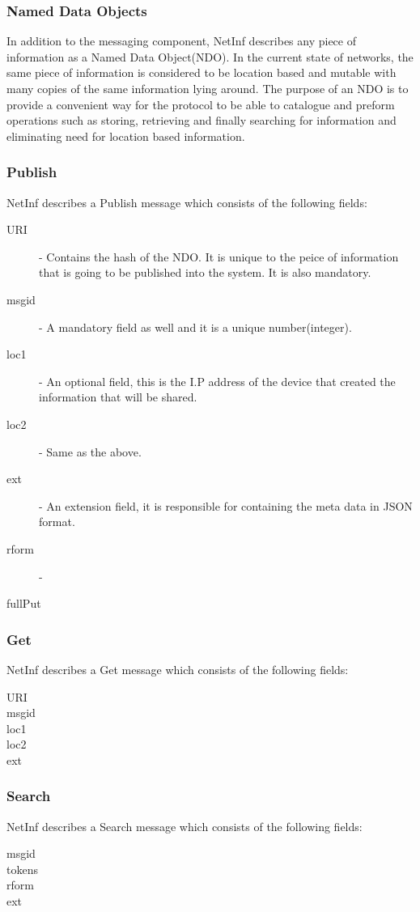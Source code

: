 \subsubsection{Named Data Objects}
In addition to the messaging component, NetInf describes any piece of information as a Named Data Object(NDO). In the current state of networks, the same piece of information is considered to be location based and mutable with many copies of the same information lying around. The purpose of an NDO is to provide a convenient way for the protocol to be able to catalogue and preform operations such as storing, retrieving and finally searching for information and eliminating need for location based information.


\subsubsection{Publish}

NetInf describes a Publish message which consists of the following fields:

\begin{description}
\item[URI]  - Contains the hash of the NDO. It is unique to the peice of information that is going to be published into the system. It is also mandatory.
\item[msgid] - A mandatory field as well and it is a unique number(integer). 
\item[loc1] - An optional field, this is the I.P address of the device that created the information that will be shared.
\item[loc2] - Same as the above.
\item[ext] - An extension field, it is responsible for containing the meta data in JSON format.
\item[rform] - 
\item[fullPut]
\end{description}

\subsubsection{Get}

NetInf describes a Get message which consists of the following fields:

\begin{description}
\item[URI]
\item[msgid]
\item[loc1]
\item[loc2]
\item[ext]
\end{description}


\subsubsection{Search}

NetInf describes a Search message which consists of the following fields:

\begin{description}
\item[msgid]
\item[tokens]
\item[rform]
\item[ext]
\end{description}

